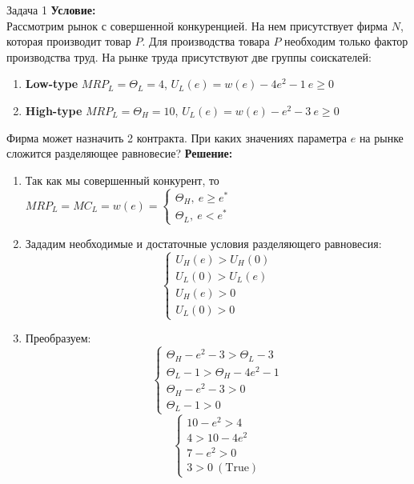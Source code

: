 \begin{mybox}{Задача 1}
    \indent\setlength{\parindent}{1em}\textbf{Условие:}\\
    \indent\setlength{\parindent}{1em}Рассмотрим рынок с совершенной конкуренцией. На нем присутствует фирма $N$, которая производит товар $P$.
    Для производства товара $P$ необходим только фактор производства труд. На рынке труда присутствуют две группы
    соискателей:
    \begin{enumerate}
        \item \textbf{Low-type} $MRP_L=\Theta_L=4$, $U_L(e)=w(e)-4e^2-1 \ e\geq0$
        \item \textbf{High-type} $MRP_L=\Theta_H=10$, $U_L(e)=w(e)-e^2-3 \ e\geq0$
    \end{enumerate}
    \indent\setlength{\parindent}{1em}Фирма может назначить 2 контракта. При каких значениях параметра $e$ на рынке
    сложится разделяющее равновесие?
    \tcblower
    \textbf{Решение:}
    \begin{enumerate}
        \item Так как мы совершенный конкурент, то $MRP_L=MC_L=w(e)=\begin{cases}
            \Theta_H, \ e\geq e^* \\
            \Theta_L, \ e<e^*
        \end{cases}$
        \item Зададим необходимые и достаточные условия разделяющего равновесия: $$\begin{cases}
            U_H(e)>U_H(0) \\
            U_L(0)>U_L(e) \\
            U_H(e)>0 \\
            U_L(0)>0
        \end{cases}$$
        \item Преобразуем: $$\begin{cases}
            \Theta_H-e^2-3>\Theta_L-3 \\
            \Theta_L-1>\Theta_H-4e^2-1 \\
            \Theta_H-e^2-3>0 \\
            \Theta_L-1>0
        \end{cases}$$
        $$\begin{cases}
            10-e^2>4 \\
            4>10-4e^2 \\
            7-e^2>0 \\
            3>0 \ (\text{True})
        \end{cases}$$

\end{enumerate}
\end{mybox}
